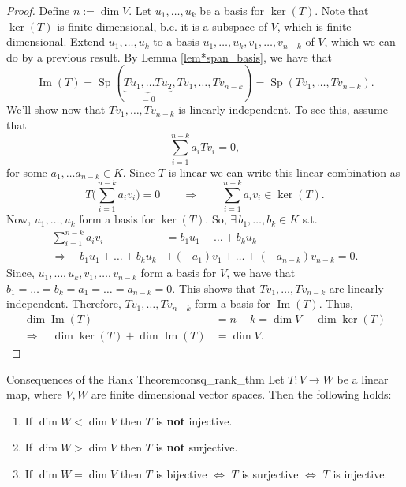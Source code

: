 \begin{proof}
	Define $n := \dim V$. Let $u_1, \hdots , u_k$ be a basis for $\ker(T)$. Note that $\ker(T)$ is finite dimensional, b.c. it is a subspace of $V$, which is finite dimensional. Extend $u_1, \hdots , u_k$ to a basis $u_1, \hdots , u_k, v_1, \hdots , v_{n-k}$ of $V$, which we can do by a previous result. By Lemma \ref{lem*span_basis}, we have that
	\[
	\operatorname{Im}(T) = \operatorname{Sp}(\underbrace{Tu_1, \hdots Tu_2}_{\displaystyle = 0}, Tv_1, \hdots , Tv_{n-k}) = \operatorname{Sp}(Tv_1, \hdots , Tv_{n-k}).
	\]
	We'll show now that $Tv_1, \hdots , Tv_{n-k}$ is linearly independent. To see this, assume that
	\[
	\sum_{i = 1}^{n-k} a_iTv_i = 0,
	\]
	for some $a_1, \hdots a_{n-k} \in K$. Since $T$ is linear we can write this linear combination as
	\[
	T\big(\sum_{i = 1}^{n-k} a_i v_i\big) = 0 \qquad \Longrightarrow \qquad \sum_{i = 1}^{n-k} a_i v_i \in \ker(T).
	\]
	Now, $u_1, \hdots , u_k$ form a basis for $\ker(T)$. So, $\exists \,b_1, \hdots , b_k \in K$ s.t. 
	\begin{align*}
		\sum_{i = 1}^{n-k} a_iv_i &= b_1u_1 + \hdots + b_k u_k\\
		\Longrightarrow \quad b_1u_1 + \hdots + b_ku_k &+ (-a_1)v_1 + \hdots + (-a_{n-k})v_{n-k} = 0.
	\end{align*}
	Since, $u_1, \hdots , u_k, v_1, \hdots , v_{n-k}$ form a basis for $V$, we have that $b_1 = \hdots = b_k = a_1 = \hdots = a_{n-k} = 0$. This shows that $Tv_1, \hdots , Tv_{n-k}$ are linearly independent. Therefore, $Tv_1, \hdots , Tv_{n-k}$ form a basis for $\operatorname{Im}(T)$. Thus,
	\begin{align*}
		\dim \operatorname{Im}(T) &= n - k = \dim V - \dim \ker(T)\\
		\Longrightarrow \quad \dim \ker(T) + \dim \operatorname{Im}(T) &= \dim V. 
	\end{align*}
	\qedhere
\end{proof}

\begin{corollary}{Consequences of the Rank Theorem}{consq_rank_thm}
	Let $T:V \to W$ be a linear map, where $V, W$ are finite dimensional vector spaces. Then the following holds:
	\begin{enumerate}
		\item If $\dim W < \dim V$ then $T$ is \textbf{not} injective.
		\item If $\dim W > \dim V$ then $T$ is \textbf{not} surjective.
		\item If $\dim W = \dim V$ then $T$ is bijective $\Longleftrightarrow$ $T$ is surjective $\Longleftrightarrow$ $T$ is injective.
	\end{enumerate}
\end{corollary}

